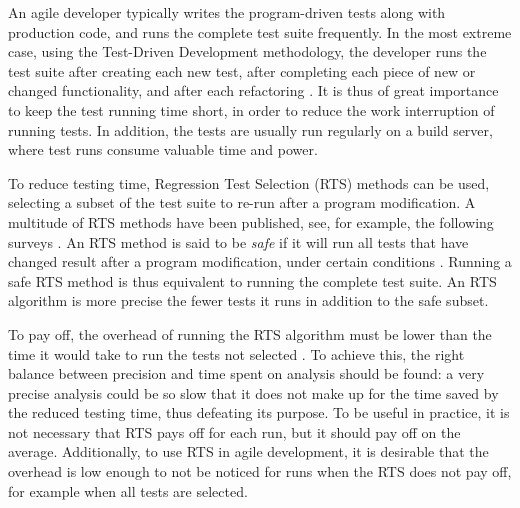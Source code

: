 {An agile developer typically writes the program-driven tests along with production code, and runs the complete test suite frequently. In the most extreme case, using the Test-Driven Development methodology, the developer runs the test suite after creating each new test, after completing each piece of new or changed functionality, and after each refactoring \cite{beck2003test}. It is thus of great importance to keep the test running time short, in order to reduce the work interruption of running tests.
In addition, the tests are usually run regularly on a build server, where test runs consume valuable time and power.

To reduce testing time, Regression Test Selection (RTS) methods can be used,
selecting a subset of the test suite to re-run after a program modification. A
multitude of RTS methods have been published, see, for example, the following
surveys \cite{rothermel1996analyzing, biswas2011regression, yoo2012regression}. An RTS method is
said to be \emph{safe} if it will run all tests that have changed result after
a program modification, under certain conditions \cite{rothermel1996analyzing}. Running a safe RTS method
is thus equivalent to running the complete test suite.  An RTS algorithm is more
precise the fewer tests it runs in addition to the safe subset.

To pay off, the overhead of running the RTS algorithm must be lower than the time it would take to run the tests not selected \cite{leung1991cost}.
To achieve this, the right balance between precision and time spent on analysis should be found:
a very precise analysis could be so slow that it does not make up for the time saved by the reduced testing time, thus defeating its purpose. To be useful in practice, it is not necessary that RTS pays off for each run, but it should pay off on the average. Additionally, to use RTS in agile development, it is desirable that the overhead is low enough to not be noticed for runs when the RTS does not pay off, for example when all tests are selected.


}
